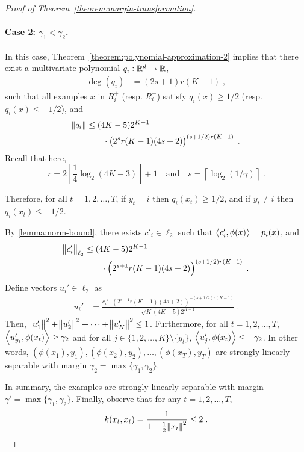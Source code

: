 \begin{proof}[Proof of Theorem~\ref{theorem:margin-transformation}]
\paragraph{Case 2: $\gamma_1 < \gamma_2$.} In this case, Theorem~\ref{theorem:polynomial-approximation-2}
implies that there exist a multivariate polynomial $q_i:\mathbb{R}^d \to \mathbb{R}$,
\begin{align*}
\deg(q_i) & = (2s+1) r(K-1) \; ,
\end{align*}
such that all examples $x$ in $R_i^+$ (resp. $R_i^-$) satisfy $q_i(x) \geq 1/2$
(resp. $q_i(x) \leq -1/2$), and
\begin{align*}
  \norm{q_i} & \le (4K-5) 2^{K-1} \\
  & \qquad \cdot \left(2^{s} r(K-1) (4s+2)\right)^{(s+1/2)r(K-1)} \; .
\end{align*}
Recall that here,
\[
r = 2 \left\lceil \frac{1}{4} \log_2(4K - 3) \right\rceil + 1 \quad \text{and} \quad s = \left \lceil \log_2(1/\gamma) \right \rceil \; .
\]

Therefore, for all $t=1,2,\dots,T$, if $y_t = i$ then $q_i(x_t) \ge 1/2$,
 and if $y_t \neq i$ then $q_i(x_t) \le -1/2$.

By \autoref{lemma:norm-bound}, there exists $c'_i \in \ell_2$ such that
$\left\langle c'_i, \phi(x) \right\rangle = p_i(x)$, and
\begin{align*}
  \norm{c'_i}_{\ell_2} & \le (4K-5) 2^{K-1} \\
  & \qquad \cdot \left(2^{s+1} r(K-1) (4s+2) \right)^{(s+1/2)r(K-1)} \; .
\end{align*}
Define vectors $u_i' \in \ell_2$ as
\begin{align*}
u_i' & = \frac{c_i'  \cdot \left(2^{s+1} r(K-1) (4s+2) \right)^{-(s+1/2)r(K-1)}}{\sqrt{K} (4K-5) 2^{K-1}} \; .
\end{align*}
Then,
$\norm{u_1'}^2 + \norm{u_2'}^2 + \dots + \norm{u_K'}^2 \le 1$.
Furthermore, for all $t=1,2,\dots,T$,
$\left\langle u'_{y_t}, \phi(x_t) \right\rangle \ge \gamma_2$
and for all $j \in \{1,2,\dots,K\} \setminus \{y_t\}$,
$\left\langle u'_j, \phi(x_t) \right\rangle \le - \gamma_2$. In other words,
$(\phi(x_1), y_1), (\phi(x_2), y_2), \dots, (\phi(x_T), y_T)$ are
strongly linearly separable with margin $\gamma_2 = \max\{\gamma_1, \gamma_2\}$.

In summary, the examples are strongly
linearly separable with margin $\gamma' = \max\{\gamma_1, \gamma_2\}$.
Finally, observe that for any $t=1,2,\dots,T$,
\[
k(x_t,x_t) = \frac{1}{1 - \frac{1}{2} \norm{x_t}^2} \le 2 \; .
\qedhere
\]
\end{proof}
